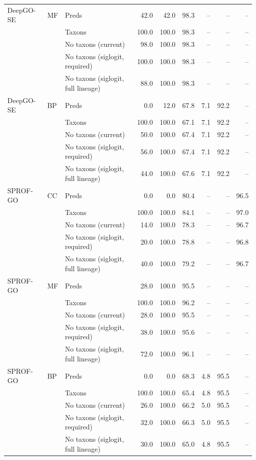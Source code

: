 \begin{tabular}{lllrrrrrr}
\addlinespace
DeepGO-SE & MF & Preds & 42.0 & 42.0 & 98.3 & -- & -- & -- \\
 &  & Taxons & 100.0 & 100.0 & 98.3 & -- & -- & -- \\
 &  & No taxons (current) & 98.0 & 100.0 & 98.3 & -- & -- & -- \\
 &  & No taxons (siglogit, required) & 100.0 & 100.0 & 98.3 & -- & -- & -- \\
 &  & No taxons (siglogit, full lineage) & 88.0 & 100.0 & 98.3 & -- & -- & -- \\
\addlinespace
DeepGO-SE & BP & Preds & 0.0 & 12.0 & 67.8 & 7.1 & 92.2 & -- \\
 &  & Taxons & 100.0 & 100.0 & 67.1 & 7.1 & 92.2 & -- \\
 &  & No taxons (current) & 50.0 & 100.0 & 67.4 & 7.1 & 92.2 & -- \\
 &  & No taxons (siglogit, required) & 56.0 & 100.0 & 67.4 & 7.1 & 92.2 & -- \\
 &  & No taxons (siglogit, full lineage) & 44.0 & 100.0 & 67.6 & 7.1 & 92.2 & -- \\
\midrule
SPROF-GO & CC & Preds & 0.0 & 0.0 & 80.4 & -- & -- & 96.5 \\
 &  & Taxons & 100.0 & 100.0 & 84.1 & -- & -- & 97.0 \\
 &  & No taxons (current) & 14.0 & 100.0 & 78.3 & -- & -- & 96.7 \\
 &  & No taxons (siglogit, required) & 20.0 & 100.0 & 78.8 & -- & -- & 96.8 \\
 &  & No taxons (siglogit, full lineage) & 40.0 & 100.0 & 79.2 & -- & -- & 96.7 \\
\addlinespace
SPROF-GO & MF & Preds & 28.0 & 100.0 & 95.5 & -- & -- & -- \\
 &  & Taxons & 100.0 & 100.0 & 96.2 & -- & -- & -- \\
 &  & No taxons (current) & 28.0 & 100.0 & 95.5 & -- & -- & -- \\
 &  & No taxons (siglogit, required) & 38.0 & 100.0 & 95.6 & -- & -- & -- \\
 &  & No taxons (siglogit, full lineage) & 72.0 & 100.0 & 96.1 & -- & -- & -- \\
\addlinespace
SPROF-GO & BP & Preds & 0.0 & 0.0 & 68.3 & 4.8 & 95.5 & -- \\
 &  & Taxons & 100.0 & 100.0 & 65.4 & 4.8 & 95.5 & -- \\
 &  & No taxons (current) & 26.0 & 100.0 & 66.2 & 5.0 & 95.5 & -- \\
 &  & No taxons (siglogit, required) & 32.0 & 100.0 & 66.3 & 5.0 & 95.5 & -- \\
 &  & No taxons (siglogit, full lineage) & 30.0 & 100.0 & 65.0 & 4.8 & 95.5 & -- \\
\bottomrule
\end{tabular}
